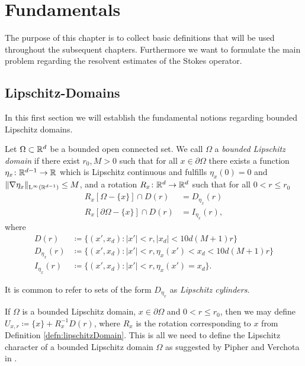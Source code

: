 \chapter{Fundamentals}

The purpose of this chapter is to collect basic definitions that will be used throughout the subsequent chapters. Furthermore we want to formulate the main problem regarding the resolvent estimates of the Stokes operator.

\section{Lipschitz-Domains}

In this first section we will establish the fundamental notions regarding bounded Lipschitz domains.

\begin{defn}
  \label{defn:lipschitzDomain}
  Let $\Omega \subset \mathbb{R}^d$ be a bounded open connected set.
  We call $\Omega$ a \emph{bounded Lipschitz domain} if there exist $r_0, M > 0$ such that for all $x \in \partial\Omega$ there exists a function $\eta_x \colon \mathbb{R}^{d - 1} \to \mathbb{R}$ which is Lipschitz continuous and fulfills $\eta_x(0) = 0$ and $\|\nabla \eta_x \|_{\mathrm{L}^\infty(\mathbb{R}^{d - 1})} \leq M$, and a rotation $R_x \colon \mathbb{R}^d \to \mathbb{R}^d$ such that for all $0 < r \leq r_0$ 
  \begin{align*}
    R_x[ \Omega - \{x\} ] \cap D(r) &= D_{\eta_x}(r) \\
    R_x[\partial\Omega - \{x\}] \cap D(r) &= I_{\eta_x}(r),
  \end{align*}
  where
  \begin{align*}
    D(r) &\coloneqq \{ (x', x_d) \colon |x'| < r, |x_d| < 10 d (M + 1) r\} \\
    D_{\eta_x}(r) &\coloneqq \{ (x', x_d) \colon |x'| < r, \eta_x(x') < x_d < 10 d(M+ 1)r\} \\
    I_{\eta_x}(r) &\coloneqq \{ (x', x_d) \colon |x'| < r, \eta_x(x') = x_d \} .
  \end{align*}
\end{defn}
  It is common to refer to sets of the form $D_{\eta_x}$ as \emph{Lipschitz cylinders}.

  If $\Omega$ is a bounded Lipschitz domain, $x \in \partial\Omega$ and $0 < r \leq r_0$, then we may define $U_{x,r} \coloneqq \{ x\} + R_x^{-1} D(r)$, where $R_x$ is the rotation corresponding to $x$ from Definition \ref{defn:lipschitzDomain}.
  This is all we need to define the Lipschitz character of a bounded Lipschitz domain $\Omega$ as suggested by Pipher and Verchota in \cite{pipherVerchota}.

